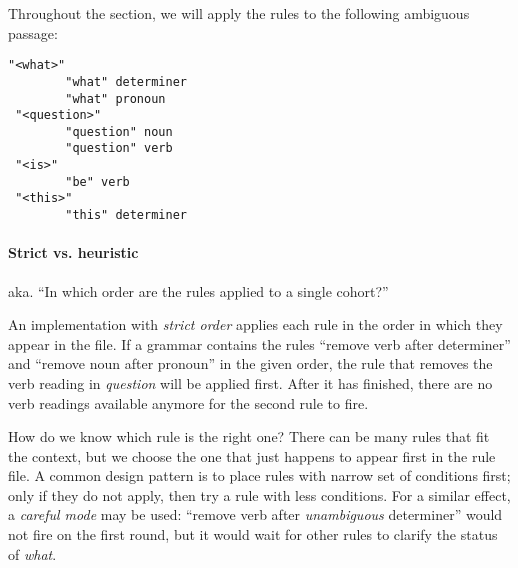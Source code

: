 
Throughout the section, we will apply the rules to the following ambiguous passage:

\begin{verbatim}
"<what>"
        "what" determiner
        "what" pronoun                                        
 "<question>"
        "question" noun
        "question" verb
 "<is>"
        "be" verb
 "<this>"
        "this" determiner
\end{verbatim}

\paragraph{Strict vs. heuristic}

aka. ``In which order are the rules applied to a single cohort?''

An implementation with \emph{strict order} applies each rule in the order in 
which they appear in the file. If a grammar contains the rules ``remove verb after determiner'' and ``remove noun after pronoun'' in the given order, the rule that removes the verb reading in \emph{question} will be applied first. After it has finished, there are no verb readings available anymore for the second rule to fire.
					
How do we know which rule is the right one? There can be many rules that fit the context, but we choose the one that just happens to appear first in the rule file. 
A common design pattern is to place rules with narrow set of conditions first; 
only if they do not apply, then try a rule with less conditions. For a similar effect,
a \emph{careful mode} may be used: ``remove verb after \emph{unambiguous} determiner'' 
would not fire on the first round, but it would wait for other rules to clarify the
status of \emph{what}.


